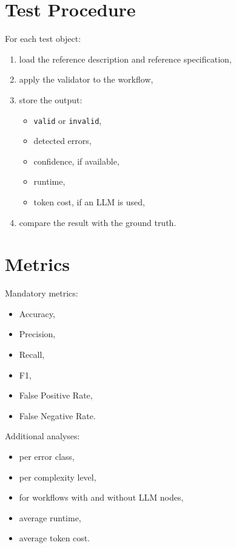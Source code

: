 \documentclass[12pt,a4paper]{article}
\begin{document}
\section{Test Procedure}

For each test object:

\begin{enumerate}
  \item load the reference description and reference specification,
  \item apply the validator to the workflow,
  \item store the output:
  \begin{itemize}
    \item \texttt{valid} or \texttt{invalid},
    \item detected errors,
    \item confidence, if available,
    \item runtime,
    \item token cost, if an LLM is used,
  \end{itemize}
  \item compare the result with the ground truth.
\end{enumerate}

\section{Metrics}

Mandatory metrics:

\begin{itemize}
  \item Accuracy,
  \item Precision,
  \item Recall,
  \item F1,
  \item False Positive Rate,
  \item False Negative Rate.
\end{itemize}

Additional analyses:

\begin{itemize}
  \item per error class,
  \item per complexity level,
  \item for workflows with and without LLM nodes,
  \item average runtime,
  \item average token cost.
\end{itemize}
\end{document}
